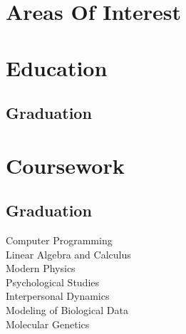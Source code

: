 \documentclass[]{deedy-resume-openfont}
\begin{document}
%
%

%
%



%
%

\begin{minipage}[t]{0.33\textwidth} 


\section{Areas Of Interest} 


\sectionsep

\section{Education} 

\subsection{Graduation}
\sectionsep



\section{Coursework}
\subsection{Graduation}
Computer Programming \\
Linear Algebra and Calculus \\
Modern Physics \\
Psychological Studies \\
Interpersonal Dynamics\\
Modeling of Biological Data\\
Molecular Genetics \\
\sectionsep

\end{minipage}
\end{document}
